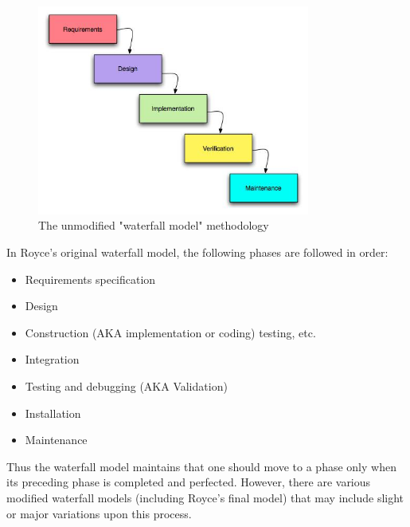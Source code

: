 	\begin{figure}[htb]
		\centering
		\includegraphics[width=0.8\textwidth]{prestudy/development_process/waterfall.jpg}
		\caption{The unmodified "waterfall model" methodology\cite{worldpress:waterfall}}
		\label{fig:waterfall-model}
	\end{figure}
	
	In Royce's original waterfall model, the following phases are followed in order:
	
	\begin{itemize}
		\item Requirements specification
		\item Design
		\item Construction (AKA implementation or coding) testing, etc.
		\item Integration
		\item Testing and debugging (AKA Validation)
		\item Installation
		\item Maintenance
	\end{itemize}
	
	Thus the waterfall model maintains that one should move to a phase only when its preceding phase is completed and perfected. However, there are various modified waterfall models (including Royce's final model) that may include slight or major variations upon this process.
